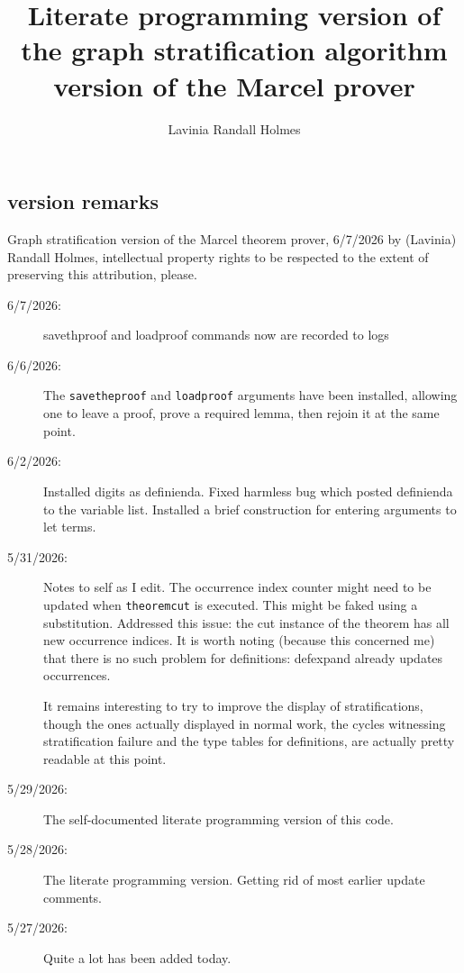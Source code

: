 \documentclass{article}
\title{Literate programming version of the graph stratification algorithm version of the Marcel prover}
\author{Lavinia Randall Holmes}
\begin{document}
\maketitle
\tableofcontents
\subsection{version remarks}

 Graph stratification version of the Marcel theorem prover, 6/7/2026
 by (Lavinia) Randall Holmes, intellectual property
 rights to be respected to the extent of preserving this attribution, please.
 
 \begin{description}

 \item[6/7/2026:]  savethproof and loadproof commands now are recorded to logs
 
 \item[6/6/2026:]  The {\tt savetheproof} and {\tt loadproof} arguments have been installed, allowing one to leave a proof,
 prove a required lemma, then rejoin it at the same point.
 
 \item[6/2/2026:]  Installed digits as definienda.  Fixed harmless bug which posted definienda to the variable list.
 Installed a brief construction for entering arguments to let terms.
 
 \item[5/31/2026:]  Notes to self as I edit.  The occurrence index counter might need to be updated
 when {\tt theoremcut} is executed.  This might be faked using a substitution.  Addressed this issue:  the cut
 instance of the theorem has all new occurrence indices.  It is worth noting (because this concerned me)
 that there is no such problem for definitions:  defexpand already updates occurrences.
 
 It remains interesting to try to improve the display of stratifications, though the ones actually displayed in normal
 work, the cycles witnessing stratification failure and the type tables for definitions, are actually pretty readable at this point.
 
 \item[5/29/2026:]  The self-documented literate programming version of this code.
 
 \item[5/28/2026:]  The literate programming version.  Getting rid of most earlier update comments.

 \item[5/27/2026:]  Quite a lot has been added today.


\end{description}
\end{document}
